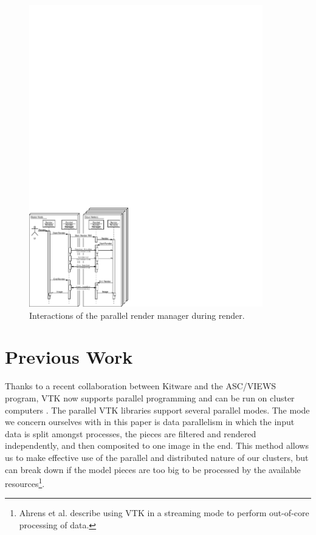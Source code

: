 \documentclass{acmsiggraph}
\begin{document}
  \begin{figure}
    \begin{center}
      \includegraphics[width=4in]
		      {images/ParallelRenderManagerInteraction}
    \end{center}
    \caption{Interactions of the parallel render manager during render.}
    \label{fig:parallel_render_manager_interaction}
  \end{figure}


  \section{Previous Work}
  \label{sec:previous_work}

  Thanks to a recent collaboration between Kitware and the ASC/VIEWS
  program, VTK now supports parallel programming and can be run on cluster
  computers \cite{Ahrens00}.  The parallel VTK libraries support several
  parallel modes.  The mode we concern ourselves with in this paper is data
  parallelism in which the input data is split amongst processes, the
  pieces are filtered and rendered independently, and then composited to
  one image in the end.  This method allows us to make effective use of the
  parallel and distributed nature of our clusters, but can break down if
  the model pieces are too big to be processed by the available
  resources\footnote{Ahrens et al. \cite{Ahrens01} describe using VTK in a
  streaming mode to perform out-of-core processing of data.}.
\end{document}
